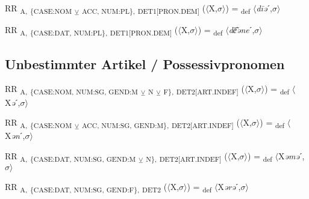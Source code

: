 {\begin{exe}
 RR \textsubscript{A,} \textsubscript{\{CASE:NOM} \textsubscript{${\veebar}$}\textsubscript{ ACC, NUM:PL\},} \textsubscript{DET1[PRON.DEM]} ($\langle$X,$\sigma $$\rangle$) = \textsubscript{def} $\langle$\textit{d\=iə}ˊ,$\sigma $$\rangle$
\end{exe}

\begin{exe}
 RR \textsubscript{A,} \textsubscript{\{CASE:DAT, NUM:PL\},} \textsubscript{DET1[PRON.DEM]} ($\langle$X,$\sigma $$\rangle$) = \textsubscript{def} $\langle$\textit{d\=e͂əne}ˊ,$\sigma $$\rangle$
\end{exe}

\subsection{Unbestimmter Artikel / Possessivpronomen}

\begin{exe}
 RR \textsubscript{A,} \textsubscript{\{CASE:NOM, NUM:SG, GEND:M} \textsubscript{${\veebar}$}\textsubscript{ N} \textsubscript{${\veebar}$}\textsubscript{ F\},} \textsubscript{DET2[ART.INDEF]} ($\langle$X,$\sigma $$\rangle$) = \textsubscript{def} $\langle$X\textit{ə}ˊ,$\sigma $$\rangle$
\end{exe}

\begin{exe}
 RR \textsubscript{A,} \textsubscript{\{CASE:NOM} \textsubscript{${\veebar}$}\textsubscript{ ACC, NUM:SG, GEND:M\},} \textsubscript{DET2[ART.INDEF]} ($\langle$X,$\sigma $$\rangle$) = \textsubscript{def} $\langle$X\textit{ən}ˊ,$\sigma $$\rangle$
\end{exe}

\begin{exe}
 RR \textsubscript{A,} \textsubscript{\{CASE:DAT, NUM:SG, GEND:M} \textsubscript{${\veebar}$}\textsubscript{ N\},} \textsubscript{DET2[ART.INDEF]} ($\langle$X,$\sigma $$\rangle$) = \textsubscript{def} $\langle$X\textit{əmə}ˊ,$\sigma $$\rangle$
\end{exe}

\begin{exe}
 RR \textsubscript{A,} \textsubscript{\{CASE:DAT, NUM:SG, GEND:F\},} \textsubscript{DET2} ($\langle$X,$\sigma $$\rangle$) = \textsubscript{def} $\langle$X\textit{ərə}ˊ,$\sigma $$\rangle$
\end{exe}

}
